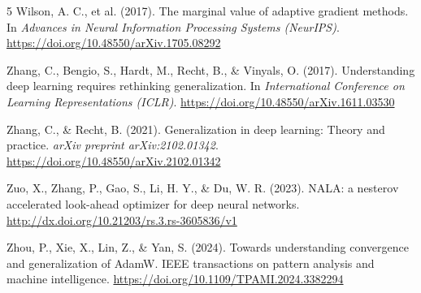 \documentclass{article}
\begin{document}
\begin{thebibliography}{5}
Wilson, A. C., et al. (2017). The marginal value of adaptive gradient methods. In \textit{Advances in Neural Information Processing Systems (NeurIPS)}. \url{https://doi.org/10.48550/arXiv.1705.08292}

Zhang, C., Bengio, S., Hardt, M., Recht, B., \& Vinyals, O. (2017). Understanding deep learning requires rethinking generalization. In \textit{International Conference on Learning Representations (ICLR)}. \url{https://doi.org/10.48550/arXiv.1611.03530}

Zhang, C., \& Recht, B. (2021). Generalization in deep learning: Theory and practice. \textit{arXiv preprint arXiv:2102.01342}. \url{https://doi.org/10.48550/arXiv.2102.01342}

Zuo, X., Zhang, P., Gao, S., Li, H. Y., \& Du, W. R. (2023). NALA: a nesterov accelerated look-ahead optimizer for deep neural networks. \url{http://dx.doi.org/10.21203/rs.3.rs-3605836/v1}

Zhou, P., Xie, X., Lin, Z., \& Yan, S. (2024). Towards understanding convergence and generalization of AdamW. IEEE transactions on pattern analysis and machine intelligence. \url{https://doi.org/10.1109/TPAMI.2024.3382294}

\end{thebibliography}
\end{document}
